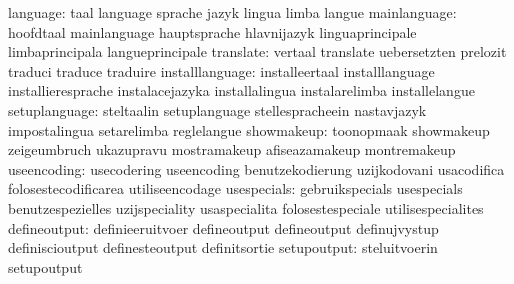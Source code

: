                         language: taal                             language
                                  sprache                          jazyk
                                  lingua                           limba
                                  langue
                    mainlanguage: hoofdtaal                        mainlanguage
                                  hauptsprache                     hlavnijazyk
                                  linguaprincipale                 limbaprincipala
                                  langueprincipale
                       translate: vertaal                          translate
                                  uebersetzten                     prelozit
                                  traduci                          traduce
                                  traduire
                 installlanguage: installeertaal                   installlanguage
                                  installieresprache               instalacejazyka
                                  installalingua                   instalarelimba
                                  installelangue
                   setuplanguage: steltaalin                       setuplanguage
                                  stellespracheein                 nastavjazyk
                                  impostalingua                    setarelimba
                                  reglelangue
                      showmakeup: toonopmaak                       showmakeup
                                  zeigeumbruch                     ukazupravu
                                  mostramakeup                     afiseazamakeup
                                  montremakeup
                     useencoding: usecodering                      useencoding
                                  benutzekodierung                 uzijkodovani
                                  usacodifica                      folosestecodificarea
                                  utiliseencodage
                     usespecials: gebruikspecials                  usespecials
                                  benutzespezielles                uzijspeciality
                                  usaspecialita                    folosestespeciale
                                  utilisespecialites
                    defineoutput: definieeruitvoer                 defineoutput
                                  defineoutput                     definujvystup
                                  definiscioutput                  definesteoutput
                                  definitsortie
                     setupoutput: steluitvoerin                    setupoutput

